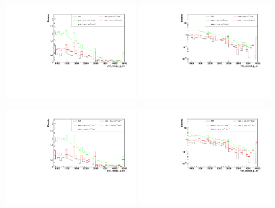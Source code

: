 \begin{figure}[h]
  \begin{center}
	\includegraphics[width=0.45\textwidth]{Plots/aQGC_kinematics/vbf_maxpt_jj_m_FM6.pdf}%
	\includegraphics[width=0.45\textwidth]{Plots/aQGC_kinematics/vbf_maxpt_jj_m_FM6_log.pdf}\\
    \caption{}
  \end{center}
\end{figure}
\begin{figure}[h]
  \begin{center}
	\includegraphics[width=0.45\textwidth]{Plots/aQGC_kinematics/vbf_maxpt_jj_m_FM7.pdf}%
	\includegraphics[width=0.45\textwidth]{Plots/aQGC_kinematics/vbf_maxpt_jj_m_FM7_log.pdf}\\
    \caption{}
  \end{center}
\end{figure}
